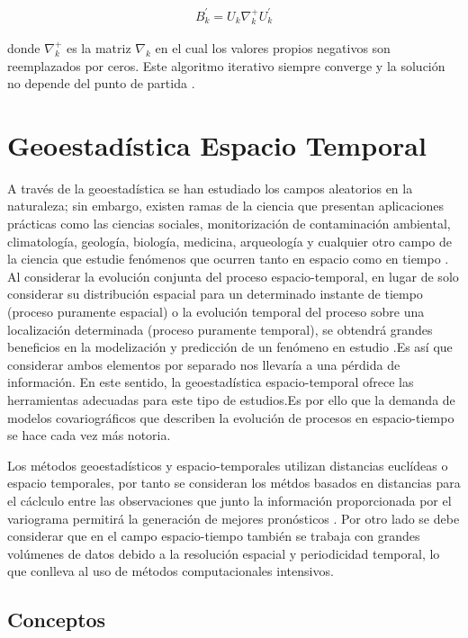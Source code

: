 \documentclass[
]{book}
\begin{document}
\begin{align*}
    B_k^{'}=U_k\nabla_k^{+}U_k^{'}
\end{align*}

donde \(\nabla_k^{+}\) es la matriz \(\nabla_k\) en el cual los valores propios negativos son reemplazados por ceros. Este algoritmo iterativo siempre converge y la solución no depende del punto de partida \citep{peter}.

\hypertarget{geoestaduxedstica-espacio-temporal}{%
\section{Geoestadística Espacio Temporal}\label{geoestaduxedstica-espacio-temporal}}

A través de la geoestadística se han estudiado los campos aleatorios en la naturaleza; sin embargo, existen ramas de la ciencia que presentan aplicaciones prácticas como las ciencias sociales, monitorización de contaminación ambiental, climatología, geología, biología, medicina, arqueología y cualquier otro campo de la ciencia que estudie fenómenos que ocurren tanto en espacio como en tiempo \citep{montero}. Al considerar la evolución conjunta del proceso espacio-temporal, en lugar de solo considerar su distribución espacial para un determinado instante de tiempo (proceso puramente espacial) o la evolución temporal del proceso sobre una localización determinada (proceso puramente temporal), se obtendrá grandes beneficios en la modelización y predicción de un fenómeno en estudio \citep{gst_casal}.Es así que considerar ambos elementos por separado nos llevaría a una pérdida de información. En este sentido, la geoestadística espacio-temporal ofrece las herramientas adecuadas para este tipo de estudios.Es por ello que la demanda de modelos covariográficos que describen la evolución de procesos en espacio-tiempo se hace cada vez más notoria.

Los métodos geoestadísticos y espacio-temporales utilizan distancias euclídeas o espacio temporales, por tanto se consideran los métdos basados en distancias para el cáclculo entre las observaciones que junto la información proporcionada por el variograma permitirá la generación de mejores pronósticos \citep{gst_casal}. Por otro lado se debe considerar que en el campo espacio-tiempo también se trabaja con grandes volúmenes de datos debido a la resolución espacial y periodicidad temporal, lo que conlleva al uso de métodos computacionales intensivos.

\hypertarget{conceptos}{%
\subsection{Conceptos}\label{conceptos}}
\end{document}
